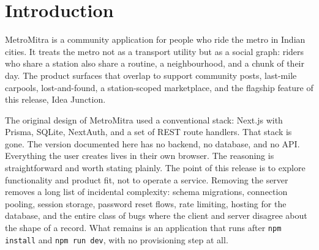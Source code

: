 \documentclass[a4paper,11pt]{article}
\begin{document}
\begin{abstract}
\noindent
MetroMitra is a hyperlocal community web app for Indian metro commuters, covering
six cities and thirty-nine real stations. The version described here is built
without a backend, without a database, and without an API layer. The browser is
the only runtime: a Next.js client bundle holds a Zustand store, persistence is
\texttt{localStorage}, and station reference data ships as a static TypeScript
module. Authentication is a deliberately thin client-side context with a demo
hash, intended for functionality exploration rather than production use. The
former travel-buddy-finder feature has been removed and replaced by Idea
Junction, a station-anchored board for entrepreneurial ideas, validation
questions, and cofounder search. This document records the system architecture,
the local data model, the auth flow, each feature and its store interactions,
the deployment topology on Vercel via GitHub Actions, the security and privacy
posture (with an honest accounting of what is and is not safe), accessibility
and performance notes, and the migration path to a real backend if the product
ever outgrows the demo.
\end{abstract}

\vspace{0.6cm}
\tableofcontents
\newpage


\section{Introduction}

MetroMitra is a community application for people who ride the metro in Indian
cities. It treats the metro not as a transport utility but as a social graph:
riders who share a station also share a routine, a neighbourhood, and a chunk of
their day. The product surfaces that overlap to support community posts,
last-mile carpools, lost-and-found, a station-scoped marketplace, and the
flagship feature of this release, Idea Junction.

The original design of MetroMitra used a conventional stack: Next.js with
Prisma, SQLite, NextAuth, and a set of REST route handlers. That stack is gone.
The version documented here has no backend, no database, and no API. Everything
the user creates lives in their own browser. The reasoning is straightforward
and worth stating plainly. The point of this release is to explore
functionality and product fit, not to operate a service. Removing the server
removes a long list of incidental complexity: schema migrations, connection
pooling, session storage, password reset flows, rate limiting, hosting for the
database, and the entire class of bugs where the client and server disagree
about the shape of a record. What remains is an application that runs after
\texttt{npm install} and \texttt{npm run dev}, with no provisioning step at
all.
\end{document}
